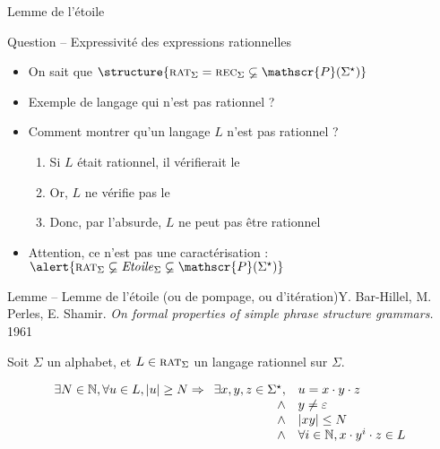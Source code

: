 
\begingroup

\begin{frame}{Lemme de l'étoile}

  \begin{block}{Question -- Expressivité des expressions rationnelles}
    \begin{itemize}
    \item On sait que $\structure{\textsc{rat}_\Sigma = \textsc{rec}_\Sigma \varsubsetneq \mathscr{P}(\Sigma^\star)}$
    \item Exemple de langage qui n'est pas rationnel ? 
    \item Comment montrer qu'un langage $L$ n'est pas rationnel ? 
      \begin{enumerate}
      \item Si $L$ était rationnel, il vérifierait le  
      \item Or, $L$ ne vérifie pas le  
      \item Donc, par l'absurde, $L$ ne peut pas être rationnel
      \end{enumerate}
    \item Attention, ce n'est pas une caractérisation : $\alert{\textsc{rat}_\Sigma \varsubsetneq \mathit{Etoile}_\Sigma \varsubsetneq \mathscr{P}(\Sigma^\star)}$
    \end{itemize}
  \end{block}

  \begin{alertblock}{Lemme -- Lemme de l'étoile (ou de pompage, ou d'itération){\scriptsize Y. Bar-Hillel, M. Perles, E. Shamir. \textit{On formal properties of simple phrase structure grammars.} 1961}}

    Soit $\Sigma$ un alphabet, et $L\in \textsc{rat}_\Sigma$ un langage rationnel sur $\Sigma$.

    $$
    \begin{array}{c}
      \exists N\in \mathbb{N}, \forall u\in L, |u| \ge N \Rightarrow
      \begin{array}[t]{rl}
        \exists x, y, z\in \Sigma^\star, &u = x\cdot y \cdot z \\
        \land& y\neq \varepsilon \\
        \land& |xy| \le N\\
        \land& \forall i \in \mathbb{N}, x\cdot y^i \cdot z \in L
      \end{array}
    \end{array}
    $$

  \end{alertblock}

\end{frame}

\endgroup
